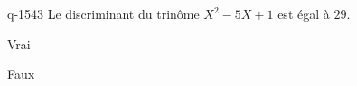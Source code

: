 \begin{truefalse}{q-1543}
Le discriminant du trinôme $X^2-5X+1$ est égal à $29$.
\item Vrai
\item* Faux
\end{truefalse}

